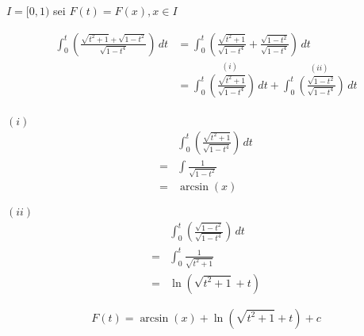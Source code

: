 \documentclass{article}
\begin{document}
\begin{enumerate}[a)]
  $I = [0, 1)$ sei $F(t) = F(x), x \in I$

  \begin{align*}
    \int_0^t \left( \frac{\sqrt{t^2 + 1} + \sqrt{1 - t^2}}{\sqrt{1 - t^4}}\right) \,dt
    &= \int_0^t \left( \frac{\sqrt{t^2 + 1}}{\sqrt{1 - t^4}} + \frac{\sqrt{1 - t^2}}{\sqrt{1 - t^4}}\right) \,dt \\
    &= \overset{(i)}{\int_0^t \left( \frac{\sqrt{t^2 + 1}}{\sqrt{1 - t^4}}\right) \,dt} +
       \overset{(ii)}{\int_0^t \left(\frac{\sqrt{1 - t^2}}{\sqrt{1 - t^4}}\right) \,dt} \\
  \end{align*}
  \begin{minipage}[t]{.45\textwidth}
    \textbf{$(i)$}
    \begin{align*}
      &\int_0^t \left( \frac{\sqrt{t^2 + 1}}{\sqrt{1 - t^4}}\right) \,dt \\
      = & \int \frac{1}{\sqrt{1 - t^2}} \\
      = & \arcsin (x)
    \end{align*}
  \end{minipage}
  \hfill
  \begin{minipage}[t]{.45\textwidth}
    \textbf{$(ii)$}
    \begin{align*}
      &\int_0^t \left( \frac{\sqrt{1 - t^2}}{\sqrt{1 - t^4}}\right) \,dt \\
      = & \int_0^t \frac{1}{\sqrt{t^2 + 1}} \\
      = & \ln \left( \sqrt{t^2 + 1} + t\right)
    \end{align*}
  \end{minipage}
  \[
    F(t) = \arcsin (x) + \ln \left( \sqrt{t^2 + 1} + t\right) + c
  \]
\end{enumerate}
\end{document}

